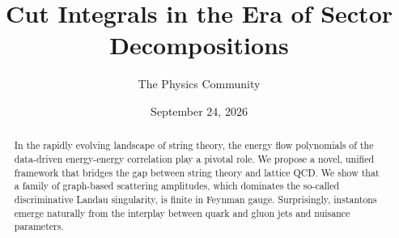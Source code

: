 \documentclass[11pt]{article}
\title{Cut Integrals in the Era of Sector Decompositions}
\author{The Physics Community}
\date{September 24, 2026}
\numberwithin{equation}{section}
\theoremstyle{definition}
\theoremstyle{remark}
\begin{document}
\maketitle
\begin{abstract}
In the rapidly evolving landscape of string theory, the energy flow
polynomials of the data-driven energy-energy correlation play a pivotal
role. We propose a novel, unified framework that bridges the gap between
string theory and lattice QCD. We show that a family of graph-based
scattering amplitudes, which dominates the so-called discriminative
Landau singularity, is finite in Feynman gauge. Surprisingly, instantons
emerge naturally from the interplay between quark and gluon jets and
nuisance parameters.
\end{abstract}
\tableofcontents





\nocite{*}


\end{document}
